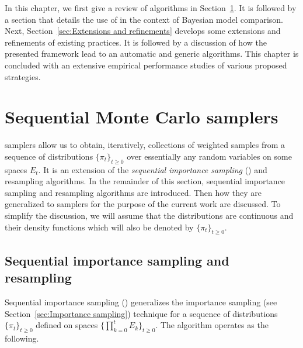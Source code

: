 In this chapter, we first give a review of \smc algorithms in
Section~\ref{sec:Sequential Monte Carlo samplers}. It is followed by a section
that details the use of \smc in the context of Bayesian model comparison.
Next, Section~\ref{sec:Extensions and refinements} develops some extensions
and refinements of existing practices. It is followed by a discussion of how
the presented framework lead to an automatic and generic algorithms. This
chapter is concluded with an extensive empirical performance studies of
various proposed strategies.

\section{Sequential Monte Carlo samplers}
\label{sec:Sequential Monte Carlo samplers}

\smc samplers allow us to obtain, iteratively, collections of weighted samples
from a sequence of distributions $\{\pi_t\}_{t\ge0}$ over essentially any
random variables on some spaces $E_t$. It is an extension of the
\emph{sequential importance sampling} (\sis) and resampling algorithms.  In
the remainder of this section, sequential importance sampling and resampling
algorithms are introduced. Then how they are generalized to \smc samplers for
the purpose of the current work are discussed. To simplify the discussion, we
will assume that the distributions are continuous and their density functions
which will also be denoted by $\{\pi_t\}_{t\ge0}$.

\subsection{Sequential importance sampling and resampling}
\label{sub:Sequential importance sampling and resampling}

Sequential importance sampling (\sis) generalizes the importance sampling (see
Section~\ref{sec:Importance sampling}) technique for a sequence of
distributions $\{\pi_t\}_{t\ge0}$ defined on spaces
$\{\prod_{k=0}^tE_k\}_{t\ge0}$. The algorithm operates as the following.

